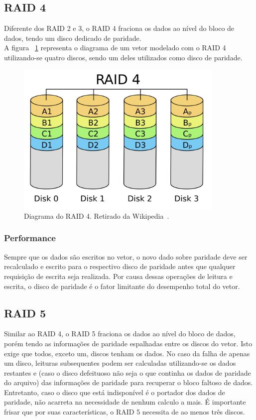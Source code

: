 		\subsection{RAID 4}
		Diferente dos RAID 2 e 3, o RAID 4 fraciona os dados ao nível do bloco de dados, tendo um disco dedicado de paridade. \\
		
		A figura ~\ref{fig:raid4} representa o diagrama de um vetor modelado com o RAID 4 utilizando-se quatro discos, sendo um deles utilizados como disco de paridade.\\
		
		\begin{figure}[htb]
			\begin{center}
				
				\includegraphics[clip,width=10.0cm]{images/RAID_4.png}
				\caption{Diagrama do RAID 4. Retirado da Wikipedia~\citep{wikiRAIDlevels}.}
				\label{fig:raid4}
			\end{center}
		\end{figure} 
		
		\subsubsection{Performance}
		Sempre que os dados são escritos no vetor, o novo dado sobre paridade deve ser recalculado e escrito para o respectivo disco de paridade antes que qualquer requisição de escrita seja realizada. Por causa dessas operações de leitura e escrita, o disco de paridade é o fator limitante do desempenho total do vetor.\\
		
		\subsection{RAID 5}
		Similar ao RAID 4, o RAID 5 fraciona os dados ao nível do bloco de dados, porém tendo as informações de paridade espalhadas entre os discos do vetor. Isto exige que todos, exceto um, discos tenham os dados. No caso da falha de apenas um disco, leituras subsequentes podem ser calculadas utilizando-se os dados restantes e (caso o disco defeituoso não seja o que continha os dados de paridade do arquivo) das informações de paridade para recuperar o bloco faltoso de dados. Entretanto, caso o disco que está indisponível é o portador dos dados de paridade, não acarreta na necessidade de nenhum calculo a mais. É importante frisar que por suas características, o RAID 5 necessita de ao menos três discos.  \\
		
